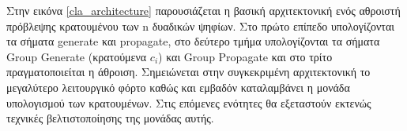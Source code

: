 Στην εικόνα \ref{cla_architecture} παρουσιάζεται η βασική αρχιτεκτονική ενός αθροιστή πρόβλεψης κρατουμένου των n δυαδικών ψηφίων. Στο πρώτο επίπεδο υπολογίζονται τα σήματα generate και propagate, στο δεύτερο τμήμα υπολογίζονται τα σήματα Group Generate (κρατούμενα $c_i$) και Group Propagate και στο τρίτο πραγματοποιείται η άθροιση. Σημειώνεται στην συγκεκριμένη αρχιτεκτονική το μεγαλύτερο λειτουργικό φόρτο καθώς και εμβαδόν καταλαμβάνει η μονάδα υπολογισμού των κρατουμένων. Στις επόμενες ενότητες θα εξεταστούν εκτενώς τεχνικές βελτιστοποίησης της μονάδας αυτής.
